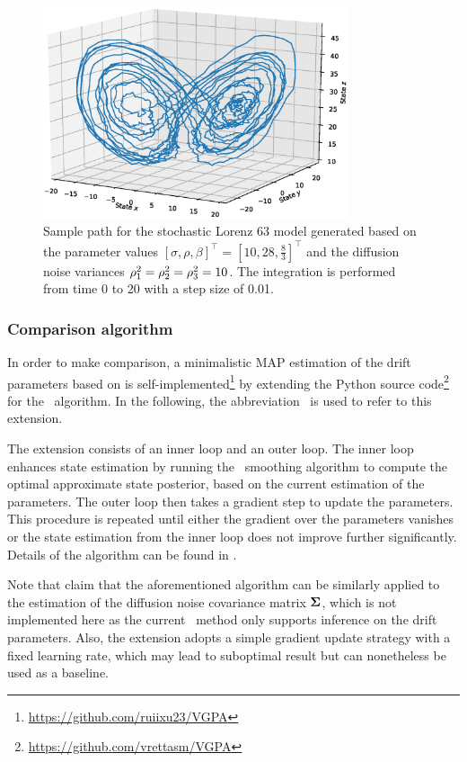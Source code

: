 \begin{figure}
    \centering
    \includegraphics[width=0.8\textwidth]{graphics/lorenz-63-sample-path}
    \caption{Sample path for the stochastic Lorenz 63 model generated based on the parameter values $[\sigma, \rho, \beta]^\top = [10, 28, \frac{8}{3}]^\top$ and the diffusion noise variances $\rho_{1}^2 = \rho_{2}^2 = \rho_{3}^2 = 10$. The integration is performed from time 0 to 20 with a step size of 0.01.}
    \label{fig-lorenz-63-sample-path}
\end{figure}

\subsubsection*{Comparison algorithm}

In order to make comparison, a minimalistic MAP estimation of the drift parameters based on \cite[Table 3]{vrettas2011estimating} is self-implemented\footnote{\url{https://github.com/ruiixu23/VGPA}} by extending the Python source code\footnote{\url{https://github.com/vrettasm/VGPA}} for the \algovgpa\ algorithm.
In the following, the abbreviation \algovgpamap\ is used to refer to this extension.

The extension consists of an inner loop and an outer loop.
The inner loop enhances state estimation by running the \algovgpa\ smoothing algorithm to compute the optimal approximate state posterior, based on the current estimation of the parameters.
The outer loop then takes a gradient step to update the parameters.
This procedure is repeated until either the gradient over the parameters vanishes or the state estimation from the inner loop does not improve further significantly. 
Details of the algorithm can be found in \cite[Section 5.2]{vrettas2011estimating}.

Note that \cite{vrettas2011estimating} claim that the aforementioned algorithm can be similarly applied to the estimation of the diffusion noise covariance matrix $\boldsymbol{\Sigma}$, which is not implemented here as the current \algolpmfsde\ method only supports inference on the drift parameters.
Also, the extension adopts a simple gradient update strategy with a fixed learning rate, which may lead to suboptimal result but can nonetheless be used as a baseline.


